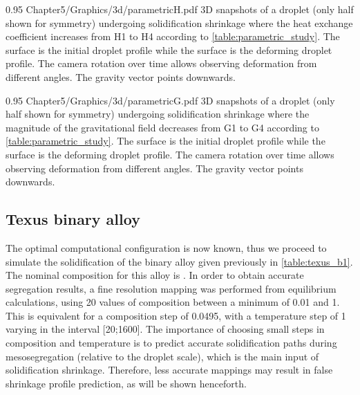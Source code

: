 \begin{figureth}
{0.95}
{Chapter5/Graphics/3d/parametricH.pdf}
{3D snapshots of a droplet (only half shown for symmetry) undergoing solidification shrinkage where the heat exchange coefficient 
increases from H1 to H4 according to \cref{table:parametric_study}. The  surface is the initial droplet profile while the  surface
is the deforming droplet profile. The camera rotation over time allows observing deformation from different angles. The gravity vector points downwards.}
\label{fig:parametricH}
\end{figureth}

\begin{figureth}
{0.95}
{Chapter5/Graphics/3d/parametricG.pdf}
{3D snapshots of a droplet (only half shown for symmetry) undergoing solidification shrinkage where the magnitude of the gravitational field
decreases from G1 to G4 according to \cref{table:parametric_study}. The  surface is the initial droplet profile while the  surface
is the deforming droplet profile. The camera rotation over time allows observing deformation from different angles.
The gravity vector points downwards.}
\label{fig:parametricG}
\end{figureth}


\subsection{Texus binary alloy}

The optimal computational configuration is now known, thus we proceed to simulate the solidification of the binary alloy given previously in \cref{table:texus_b1}.
The nominal composition for this alloy is . In order to obtain accurate segregation results, 
a fine resolution mapping was performed from equilibrium calculations, using 20 values of composition between a minimum of \SI{0.01}{\ucomposition} and \SI{1}{\ucomposition}. 
This is equivalent for a composition step of \SI{0.0495}{\ucomposition}, with a temperature step of \SI{1}{\udegC} 
varying in the interval [\SI{20}{\udegC};\SI{1600}{\udegC}].
The importance of choosing small steps in composition and temperature is to predict 
accurate solidification paths during mesosegregation (relative to the droplet scale), which is the main input of solidification shrinkage. 
Therefore, less accurate mappings may result in false shrinkage profile prediction, as will be shown henceforth.

